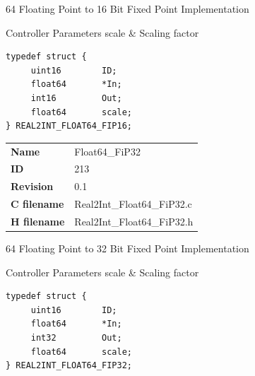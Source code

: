 64 Floating Point to 16 Bit Fixed Point Implementation

\begin{XtoCtabular}{Controller Parameters}
scale & Scaling factor\tabularnewline
\hline
\end{XtoCtabular}

\begin{lstlisting}
typedef struct {
     uint16        ID;
     float64       *In;
     int16         Out;
     float64       scale;
} REAL2INT_FLOAT64_FIP16;
\end{lstlisting}

\ifdefined \AddTestReports
{}
\fi
{}
\nopagebreak[0]
\begin{tabular}{l l}
\textbf{Name} & Float64\_FiP32 \tabularnewline
\textbf{ID} & 213 \tabularnewline
\textbf{Revision} & 0.1 \tabularnewline
\textbf{C filename} & Real2Int\_Float64\_FiP32.c \tabularnewline
\textbf{H filename} & Real2Int\_Float64\_FiP32.h \tabularnewline
\end{tabular}
\vspace{1ex}

64 Floating Point to 32 Bit Fixed Point Implementation

\begin{XtoCtabular}{Controller Parameters}
scale & Scaling factor\tabularnewline
\hline
\end{XtoCtabular}

\begin{lstlisting}
typedef struct {
     uint16        ID;
     float64       *In;
     int32         Out;
     float64       scale;
} REAL2INT_FLOAT64_FIP32;
\end{lstlisting}

\ifdefined \AddTestReports
{}
\fi
